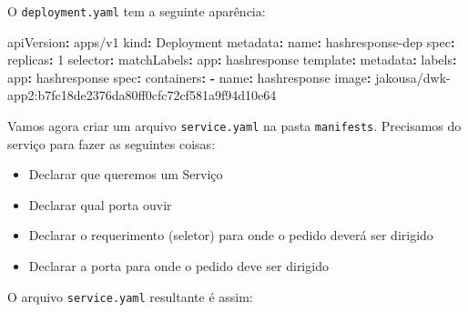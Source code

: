 \documentclass[
]{article}
\newenvironment{Shaded}{}{}
\newcommand{\AttributeTok}[1]{\textcolor[rgb]{0.49,0.56,0.16}{#1}}
\newcommand{\DecValTok}[1]{\textcolor[rgb]{0.25,0.63,0.44}{#1}}
\newcommand{\FunctionTok}[1]{\textcolor[rgb]{0.02,0.16,0.49}{#1}}
\newcommand{\KeywordTok}[1]{\textcolor[rgb]{0.00,0.44,0.13}{\textbf{#1}}}
\providecommand{\tightlist}{%
  \setlength{\itemsep}{0pt}\setlength{\parskip}{0pt}}
\begin{document}
O \texttt{deployment.yaml} tem a seguinte aparência:

\begin{Shaded}
\begin{Highlighting}[]
\FunctionTok{apiVersion}\KeywordTok{:}\AttributeTok{ apps/v1}
\FunctionTok{kind}\KeywordTok{:}\AttributeTok{ Deployment}
\FunctionTok{metadata}\KeywordTok{:}
\AttributeTok{  }\FunctionTok{name}\KeywordTok{:}\AttributeTok{ hashresponse{-}dep}
\FunctionTok{spec}\KeywordTok{:}
\AttributeTok{  }\FunctionTok{replicas}\KeywordTok{:}\AttributeTok{ }\DecValTok{1}
\AttributeTok{  }\FunctionTok{selector}\KeywordTok{:}
\AttributeTok{    }\FunctionTok{matchLabels}\KeywordTok{:}
\AttributeTok{      }\FunctionTok{app}\KeywordTok{:}\AttributeTok{ hashresponse}
\AttributeTok{  }\FunctionTok{template}\KeywordTok{:}
\AttributeTok{    }\FunctionTok{metadata}\KeywordTok{:}
\AttributeTok{      }\FunctionTok{labels}\KeywordTok{:}
\AttributeTok{        }\FunctionTok{app}\KeywordTok{:}\AttributeTok{ hashresponse}
\AttributeTok{    }\FunctionTok{spec}\KeywordTok{:}
\AttributeTok{      }\FunctionTok{containers}\KeywordTok{:}
\AttributeTok{        }\KeywordTok{{-}}\AttributeTok{ }\FunctionTok{name}\KeywordTok{:}\AttributeTok{ hashresponse}
\AttributeTok{          }\FunctionTok{image}\KeywordTok{:}\AttributeTok{ jakousa/dwk{-}app2:b7fc18de2376da80ff0cfc72cf581a9f94d10e64}
\end{Highlighting}
\end{Shaded}

Vamos agora criar um arquivo \texttt{service.yaml} na pasta
\texttt{manifests}. Precisamos do serviço para fazer as seguintes
coisas:

\begin{itemize}
\tightlist
\item
  Declarar que queremos um Serviço
\item
  Declarar qual porta ouvir
\item
  Declarar o requerimento (seletor) para onde o pedido deverá ser
  dirigido
\item
  Declarar a porta para onde o pedido deve ser dirigido
\end{itemize}

O arquivo \texttt{service.yaml} resultante é assim:
\end{document}
